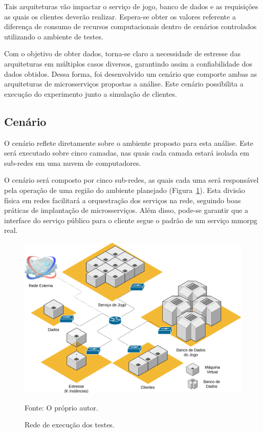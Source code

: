 Tais arquiteturas vão impactar o serviço de jogo, banco de dados e as requisições as quais os clientes deverão realizar.
%
Espera-se obter os valores referente a diferença de consumo de recursos computacionais dentro de cenários controlados utilizando o ambiente de testes.



Com o objetivo de obter dados, torna-se claro a necessidade de estresse das arquiteturas em múltiplos casos diversos, garantindo assim a confiabilidade dos dados obtidos.
%
Dessa forma, foi desenvolvido um cenário que comporte ambas as arquiteturas de microsserviços propostas a análise.
%
Este cenário possibilita a execução do experimento junto a simulação de clientes.



\subsection{Cenário}



O cenário reflete diretamente sobre o ambiente proposto para esta análise.
%
Este será executado sobre cinco camadas, nas quais cada camada estará isolada em sub-redes em uma nuvem de computadores.

O cenário será composto por cinco sub-redes, as quais cada uma será responsável pela operação de uma região do ambiente planejado (Figura~\ref{fig:cenario}).
%
Esta divisão física em redes facilitará a orquestração dos serviços na rede, seguindo boas práticas de implantação de microsserviços.
%
Além disso, pode-se garantir que a interface do serviço público para o cliente segue o padrão de um serviço \ac{mmorpg} real.

\begin{figure}[htb!]
  \caption{Rede de execução dos testes.}
  \label{fig:cenario}
  \includegraphics[width=\textwidth]{img/cap3/cenario.png}
  \centering

  Fonte: O próprio autor.
\end{figure}

